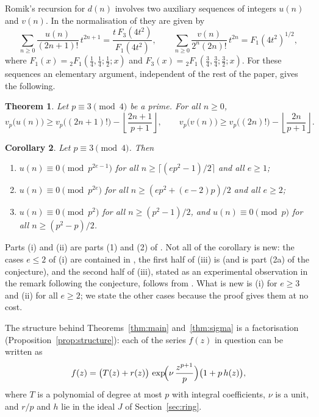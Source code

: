 \documentclass[11pt]{amsart}
\newtheorem{theorem}{Theorem}[section]
\newtheorem{corollary}[theorem]{Corollary}
\theoremstyle{definition}
\theoremstyle{remark}
\newcommand{\fl}[1]{\left\lfloor #1 \right\rfloor}
\begin{document}
Romik's recursion for $d(n)$ involves two auxiliary sequences of integers $u(n)$ and $v(n)$. In
the normalisation of \cite[\S2]{KM} they are given by
\begin{equation}\label{eq:uv}
\sum_{n\ge0}\frac{u(n)}{(2n+1)!}\,t^{2n+1}=\frac{t\,F_3(4t^2)}{F_1(4t^2)},\qquad
\sum_{n\ge0}\frac{v(n)}{2^n(2n)!}\,t^{2n}=F_1(4t^2)^{1/2},
\end{equation}
where $F_1(x)={}_2F_1(\tfrac14,\tfrac14;\tfrac12;x)$ and
$F_3(x)={}_2F_1(\tfrac34,\tfrac34;\tfrac32;x)$. For these sequences an elementary argument,
independent of the rest of the paper, gives the following.

\begin{theorem}\label{thm:uv}
Let $p\equiv3\pmod4$ be a prime. For all $n\ge0$,
\[
v_p\bigl(u(n)\bigr)\ge v_p\bigl((2n+1)!\bigr)-\fl{\frac{2n+1}{p+1}},\qquad
v_p\bigl(v(n)\bigr)\ge v_p\bigl((2n)!\bigr)-\fl{\frac{2n}{p+1}} .
\]
\end{theorem}

\begin{corollary}\label{cor:KM43}
Let $p\equiv3\pmod4$. Then
\begin{enumerate}
\item[(i)] $u(n)\equiv0\pmod{p^{2e-1}}$ for all $n\ge\lceil (ep^2-1)/2\rceil$ and all $e\ge1$;
\item[(ii)] $u(n)\equiv0\pmod{p^{2e}}$ for all $n\ge(ep^2+(e-2)p)/2$ and all $e\ge2$;
\item[(iii)] $u(n)\equiv0\pmod{p^2}$ for all $n\ge(p^2-1)/2$, and $u(n)\equiv0\pmod p$ for all
$n\ge(p^2-p)/2$.
\end{enumerate}
\end{corollary}

Parts (i) and (ii) are parts (1) and (2) of \cite[Conjecture~43]{KM}. Not all of the corollary is
new: the cases $e\le2$ of (i) are contained in \cite[Theorem~9]{KM}, the first half of (iii) is
\cite[Proposition~8]{KM} (and is part (2a) of the conjecture), and the second half of (iii), stated
as an experimental observation in the remark following the conjecture, follows from
\cite[Lemma~7 and Proposition~8]{KM}. What is new is (i) for $e\ge3$ and (ii) for all $e\ge2$; we
state the other cases because the proof gives them at no cost.

The structure behind Theorems~\ref{thm:main} and~\ref{thm:sigma} is a factorisation
(Proposition~\ref{prop:structure}): each of
the series $f(z)$ in question can be written as
\[
f(z)=\bigl(T(z)+r(z)\bigr)\,\exp\!\Bigl(\nu\,\frac{z^{p+1}}{p}\Bigr)\bigl(1+p\,h(z)\bigr),
\]
where $T$ is a polynomial of degree at most $p$ with integral coefficients, $\nu$ is a unit, and
$r/p$ and $h$ lie in the ideal $J$ of Section~\ref{sec:ring}.
\end{document}

